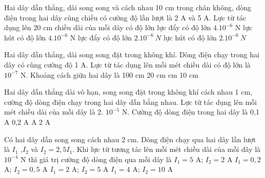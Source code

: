 \begin{vidu} %
Hai dây dẫn thẳng, dài song song và cách nhau 10 cm trong chân không, dòng điện trong hai dây cùng chiều có cường độ lần lượt là 2 A và 5 A. Lực từ tác dụng lên 20 cm chiều dài của mỗi dây có độ lớn
\choice
{lực đẩy có độ lớn $4.10^{-6}$ N}
{\True lực hút có độ lớn $4.10^{-6}$ N}
{lực đẩy có độ lớn $2.10^{-6}\ N$}
{lực hút có độ lớn $2.10^{-6}\ N$}
\end{vidu}
\begin{vidu} %
	Hai dây dẫn thẳng, dài song song đặt trong không khí. Dòng điện chạy trong hai dây có cùng cường độ 1 A. Lực từ tác dụng lên mỗi mét chiều dài có độ lớn là $10^{-7}$ N. Khoảng cách giữa hai dây là
	\choice
	{100 cm}
	{20 cm}
	{ cm}
	{10 cm}
\end{vidu}
\begin{vidu} %
	Hai dây dẫn thẳng dài vô hạn, song song đặt trong không khí cách nhau 1 cm, cường độ dòng điện chạy trong hai dây dẫn bằng nhau. Lực từ tác dụng lên mỗi mét chiều dài của mỗi dây là 2. $10^{-5}$ N. Cường độ dòng điện trong hai dây là
	\choice
	{0,1 A}
	{0,2 A}
	{ A}
	{2 A}
\end{vidu}
\begin{vidu} %
	Có hai dây dẫn song song cách nhau 2 cm. Dòng điện chạy qua hai dây lần lượt là $I_1$ ,$I_2$ và $I_2 = 2,5I_1$. Khi lực từ tương tác lên mỗi mét chiều dài của mỗi dây là $10^{-4}$ N thì giá trị cường độ dòng điện qua mỗi dây là
	\choice
	{$I_1 = 5$ A; $I_2 = 2$ A}
	{$I_1 = 0,2$ A; $I_2 = 0,5$ A}
	{\True $I_1 = 2$ A; $I_2 = 5$ A}
	{$I_1 = 4$ A; $I_2 = 10$ A}
\end{vidu}
